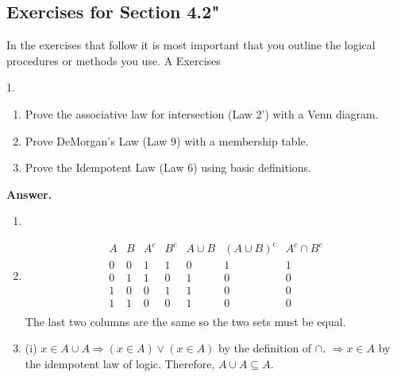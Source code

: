 \documentclass[10pt,]{book}
\theoremstyle{plain}
\theoremstyle{definition}
\theoremstyle{definition}
\theoremstyle{definition}
\begin{document}
\subsection[Exercises for Section 4.2"]{Exercises for Section 4.2"}\label{exer-4-2}
\typeout{************************************************}
\typeout{************************************************}
In the exercises that follow it is most important that you outline the logical procedures or methods you use.%
\hypertarget{exercisegroup-3}{}\typeout{************************************************}
\typeout{************************************************}
A Exercises%
\begin{exercisegroup}
\item[1.]\hypertarget{exercise-6}{}\leavevmode%
\begin{enumerate}[label=\alph*]
\item\hypertarget{li-23}{}Prove the associative law for intersection (Law 2') with a Venn diagram.%
\item\hypertarget{li-24}{}Prove DeMorgan's Law (Law 9) with a membership table.%
\item\hypertarget{li-25}{}Prove the Idempotent Law (Law 6) using basic definitions.%
\end{enumerate}
%
\par\smallskip
\par\smallskip
\noindent\textbf{Answer.}\hypertarget{answer-3}{}\quad
\leavevmode%
\begin{enumerate}[label=\alph*]
\item\hypertarget{li-26}{}%
\item\hypertarget{li-27}{}
 \[\begin{array}{ccccccc}
 A & B &A^c & B^c & A\cup B & (A\cup B)^c &A^c\cap B^c \\
 \hline
 0 & 0 &1 &  1 &  0 &  1 &  1 \\
 0 & 1 &1 &  0 &  1 &  0 &  0 \\
 1 & 0 & 0 &  1 &  1 &  0 &  0 \\
 1 & 1 & 0 &  0 &  1 &  0 &  0 \\
\end{array}\]
The last two columns are the same so the two sets must be equal.%
\item\hypertarget{li-28}{} (i) \(x\in A\cup A \Rightarrow  (x\in A) \lor (x\in A)\) by the definition of \(\cap\).
    \(\Rightarrow x\in A\) by the idempotent law of logic.
 Therefore, \(A\cup A\subseteq A\). %


\end{enumerate}
\end{exercisegroup}
\end{document}
